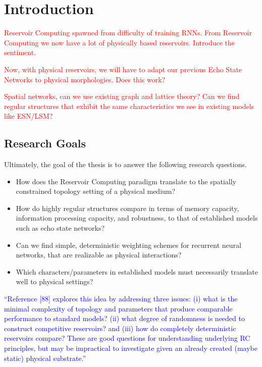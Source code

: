 \chapter{Introduction}
\label{ch:intro}

\textcolor{red}{
  Reservoir Computing spawned from difficulty of training RNNs. From Reservoir
Computing we now have a lot of physically based reservoirs. Introduce the
sentiment.
}

\textcolor{red}{
  Now, with physical reservoirs, we will have to adapt our previous Echo State
Networks to physical morphologies. Does this work?
}

\textcolor{red}{
  Spatial networks, can we use existing graph and lattice theory? Can we find
regular structures that exhibit the same characteristics we see in existing
models like ESN/LSM?
}

\section{Research Goals}

Ultimately, the goal of the thesis is to answer the following research
questions.

\begin{itemize}
\item How does the Reservoir Computing paradigm translate to the spatially
constrained topology setting of a physical medium?
\item How do highly regular structures compare in terms of memory capacity,
information processing capacity, and robustness, to that of established models
such as echo state networks?
\item Can we find simple, deterministic weighting schemes for recurrent neural
networks, that are realizable as physical interactions?
\item Which characters/parameters in established models must necessarily
translate well to physical settings?
\end{itemize}

\textcolor{blue}{
  ``Reference [88] explores this idea by addressing three issues: (i) what is
the minimal complexity of topology and parameters that produce comparable
performance to standard models?  (ii) what degree of randomness is needed to
construct competitive reservoirs? and (iii) how do completely deterministic
reservoirs compare? These are good questions for understanding underlying RC
principles, but may be impractical to investigate given an already created
(maybe static) physical substrate.''
}

